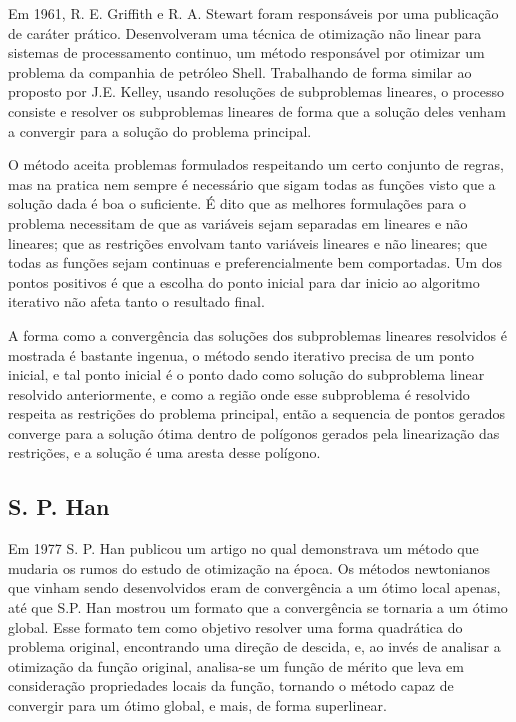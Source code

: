 Em 1961, R. E. Griffith e R. A. Stewart \cite{griffith1961nonlinear} foram responsáveis por uma publicação
de caráter prático. Desenvolveram uma técnica de otimização não linear para sistemas de processamento
continuo, um método responsável por otimizar um problema da companhia de petróleo Shell. Trabalhando
de forma similar ao proposto por J.E. Kelley, usando resoluções de subproblemas lineares, o processo
consiste e resolver os subproblemas lineares de forma que a solução deles venham a convergir para
a solução do problema principal.

O método aceita problemas formulados respeitando um certo conjunto de regras, mas na pratica nem
sempre é necessário que sigam todas as funções visto que a solução dada é boa o suficiente. É dito
que as melhores formulações para o problema necessitam de que as variáveis sejam separadas em lineares
e não lineares; que as restrições envolvam tanto variáveis lineares e não lineares; que todas as funções
sejam continuas e preferencialmente bem comportadas. Um dos pontos positivos é que a escolha do ponto
inicial para dar inicio ao algoritmo iterativo não afeta tanto o resultado final.

A forma como a convergência das soluções dos subproblemas lineares resolvidos é mostrada é
bastante ingenua, o método sendo iterativo precisa de um ponto inicial, e tal ponto inicial é o
ponto dado como solução do subproblema linear resolvido anteriormente, e como a região onde esse
subproblema é resolvido respeita as restrições do problema principal, então a sequencia de pontos
gerados converge para a solução ótima dentro de polígonos gerados pela linearização das
restrições, e a solução é uma aresta desse polígono.

\subsection{S. P. Han}
Em 1977 S. P. Han \cite{han1977globally} publicou um artigo no qual demonstrava um método que mudaria
os rumos do estudo de otimização na época. Os métodos newtonianos que vinham sendo desenvolvidos
eram de convergência a um ótimo local apenas, até que S.P. Han mostrou um formato que a convergência
se tornaria a um ótimo global. Esse formato tem como objetivo resolver uma forma quadrática do
problema original, encontrando uma direção de descida, e, ao invés de analisar a otimização da
função original, analisa-se um função de mérito que leva em consideração propriedades locais da
função, tornando o método capaz de convergir para um ótimo global, e mais, de forma superlinear.

